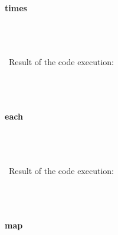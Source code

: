 \documentclass{article}
\begin{document}
\paragraph{ times}\

\begin{verbatim}

\end{verbatim}


\paragraph{}\
Result of the code execution:

\begin{verbatim} 

\end{verbatim}

\paragraph{}\




\paragraph{ each}\

\begin{verbatim}

\end{verbatim}


\paragraph{}\
Result of the code execution:

\begin{verbatim} 

\end{verbatim}

\paragraph{}\




\paragraph{ map}\

\begin{verbatim}

\end{verbatim}
\end{document}
